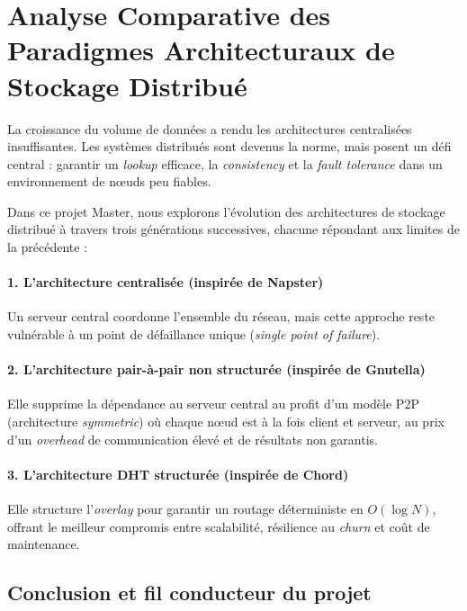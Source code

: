 \section{Analyse Comparative des Paradigmes Architecturaux de Stockage Distribu\'e}

\setlength{\parskip}{3pt}

La croissance du volume de donn\'ees a rendu les architectures centralis\'ees insuffisantes. Les syst\`emes distribu\'es sont devenus la norme, mais posent un d\'efi central : garantir un \emph{lookup} efficace, la \emph{consistency} et la \emph{fault tolerance} dans un environnement de n\oe uds peu fiables.

Dans ce projet Master, nous explorons l'\'evolution des architectures de stockage distribu\'e \`a travers trois g\'en\'erations successives, chacune r\'epondant aux limites de la pr\'ec\'edente :

\paragraph{1. L'architecture centralis\'ee (inspir\'ee de Napster)}
Un serveur central coordonne l'ensemble du r\'eseau, mais cette approche reste vuln\'erable \`a un point de d\'efaillance unique (\emph{single point of failure}).

\paragraph{2. L'architecture pair-\`a-pair non structur\'ee (inspir\'ee de Gnutella)}
Elle supprime la d\'ependance au serveur central au profit d'un mod\`ele P2P (architecture \emph{symmetric}) o\`u chaque n\oe ud est \`a la fois client et serveur, au prix d'un \emph{overhead} de communication \'elev\'e et de r\'esultats non garantis.

\paragraph{3. L'architecture DHT structur\'ee (inspir\'ee de Chord)}
Elle structure l'\emph{overlay} pour garantir un routage d\'eterministe en $O(\log N)$, offrant le meilleur compromis entre scalabilit\'e, r\'esilience au \emph{churn} et co\^ut de maintenance.




\subsection{Conclusion et fil conducteur du projet}

